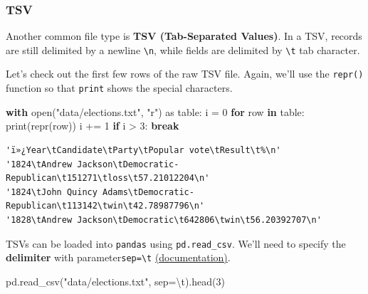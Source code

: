 \documentclass[
  letterpaper,
  DIV=11,
  numbers=noendperiod]{scrreprt}
\newenvironment{Shaded}{\begin{snugshade}}{\end{snugshade}}
\newcommand{\BuiltInTok}[1]{\textcolor[rgb]{0.00,0.23,0.31}{#1}}
\newcommand{\CharTok}[1]{\textcolor[rgb]{0.13,0.47,0.30}{#1}}
\newcommand{\ControlFlowTok}[1]{\textcolor[rgb]{0.00,0.23,0.31}{\textbf{#1}}}
\newcommand{\DecValTok}[1]{\textcolor[rgb]{0.68,0.00,0.00}{#1}}
\newcommand{\ImportTok}[1]{\textcolor[rgb]{0.00,0.46,0.62}{#1}}
\newcommand{\KeywordTok}[1]{\textcolor[rgb]{0.00,0.23,0.31}{\textbf{#1}}}
\newcommand{\NormalTok}[1]{\textcolor[rgb]{0.00,0.23,0.31}{#1}}
\newcommand{\OperatorTok}[1]{\textcolor[rgb]{0.37,0.37,0.37}{#1}}
\newcommand{\StringTok}[1]{\textcolor[rgb]{0.13,0.47,0.30}{#1}}
\begin{document}
\subsubsection{TSV}\label{tsv}

Another common file type is \textbf{TSV (Tab-Separated Values)}. In a
TSV, records are still delimited by a newline
\texttt{\textbackslash{}n}, while fields are delimited by
\texttt{\textbackslash{}t} tab character.

Let's check out the first few rows of the raw TSV file. Again, we'll use
the \texttt{repr()} function so that \texttt{print} shows the special
characters.

\begin{Shaded}
\begin{Highlighting}[]
\ControlFlowTok{with} \BuiltInTok{open}\NormalTok{(}\StringTok{"data/elections.txt"}\NormalTok{, }\StringTok{"r"}\NormalTok{) }\ImportTok{as}\NormalTok{ table:}
\NormalTok{    i }\OperatorTok{=} \DecValTok{0}
    \ControlFlowTok{for}\NormalTok{ row }\KeywordTok{in}\NormalTok{ table:}
        \BuiltInTok{print}\NormalTok{(}\BuiltInTok{repr}\NormalTok{(row))}
\NormalTok{        i }\OperatorTok{+=} \DecValTok{1}
        \ControlFlowTok{if}\NormalTok{ i }\OperatorTok{\textgreater{}} \DecValTok{3}\NormalTok{:}
            \ControlFlowTok{break}
\end{Highlighting}
\end{Shaded}

\begin{verbatim}
'ï»¿Year\tCandidate\tParty\tPopular vote\tResult\t%\n'
'1824\tAndrew Jackson\tDemocratic-Republican\t151271\tloss\t57.21012204\n'
'1824\tJohn Quincy Adams\tDemocratic-Republican\t113142\twin\t42.78987796\n'
'1828\tAndrew Jackson\tDemocratic\t642806\twin\t56.20392707\n'
\end{verbatim}

TSVs can be loaded into \texttt{pandas} using \texttt{pd.read\_csv}.
We'll need to specify the \textbf{delimiter} with
parameter\texttt{sep=\textquotesingle{}\textbackslash{}t\textquotesingle{}}
\href{https://pandas.pydata.org/docs/reference/api/pandas.read_csv.html}{(documentation)}.

\begin{Shaded}
\begin{Highlighting}[]
\NormalTok{pd.read\_csv(}\StringTok{"data/elections.txt"}\NormalTok{, sep}\OperatorTok{=}\StringTok{\textquotesingle{}}\CharTok{\textbackslash{}t}\StringTok{\textquotesingle{}}\NormalTok{).head(}\DecValTok{3}\NormalTok{)}
\end{Highlighting}
\end{Shaded}
\end{document}
